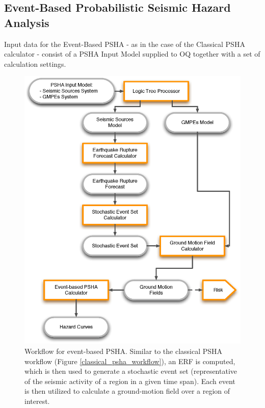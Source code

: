 \subsection{Event-Based Probabilistic Seismic Hazard Analysis}
\label{section:event-basedPSHA}
Input data for the Event-Based PSHA - as in the case of the Classical PSHA 
calculator - consist of a PSHA Input Model supplied to OQ together with a 
set of calculation settings.
%
\begin{figure}
\centering
\includegraphics[width=14cm]{./Figures/Part_Hazard/event_based_workflow.eps}
\caption{Workflow for event-based PSHA. Similar to the classical PSHA workflow 
(Figure \ref{classical_psha_workflow}), an ERF is computed, which is then used 
to generate a stochastic event set (representative of the seismic activity of 
a region in a given time span). Each event is then utilized to calculate a 
ground-motion field over a region of interest.}
\label{event_based_workflow}
\end{figure}
